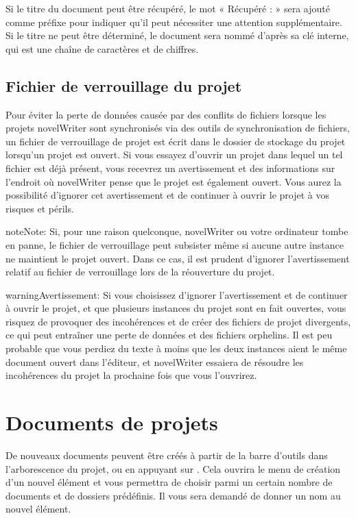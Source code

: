 \documentclass[a4paper,11pt,french]{sphinxmanual}
\begin{document}
\sphinxAtStartPar
Si le titre du document peut être récupéré, le mot « Récupéré : » sera ajouté comme préfixe pour indiquer qu’il peut nécessiter une attention supplémentaire. Si le titre ne peut être déterminé, le document sera nommé d’après sa clé interne, qui est une chaîne de caractères et de chiffres.


\subsection{Fichier de verrouillage du projet}
\label{\detokenize{project_overview:project-lockfile}}\label{\detokenize{project_overview:a-proj-roots-lock}}
\sphinxAtStartPar
Pour éviter la perte de données causée par des conflits de fichiers lorsque les projets novelWriter sont synchronisés via des outils de synchronisation de fichiers, un fichier de verrouillage de projet est écrit dans le dossier de stockage du projet lorsqu’un projet est ouvert. Si vous essayez d’ouvrir un projet dans lequel un tel fichier est déjà présent, vous recevrez un avertissement et des informations sur l’endroit où novelWriter pense que le projet est également ouvert. Vous aurez la possibilité d’ignorer cet avertissement et de continuer à ouvrir le projet à vos risques et périls.

\begin{sphinxadmonition}{note}{Note:}
\sphinxAtStartPar
Si, pour une raison quelconque, novelWriter ou votre ordinateur tombe en panne, le fichier de verrouillage peut subsister même si aucune autre instance ne maintient le projet ouvert. Dans ce cas, il est prudent d’ignorer l’avertissement relatif au fichier de verrouillage lors de la réouverture du projet.
\end{sphinxadmonition}

\begin{sphinxadmonition}{warning}{Avertissement:}
\sphinxAtStartPar
Si vous choisissez d’ignorer l’avertissement et de continuer à ouvrir le projet, et que plusieurs instances du projet sont en fait ouvertes, vous risquez de provoquer des incohérences et de créer des fichiers de projet divergents, ce qui peut entraîner une perte de données et des fichiers orphelins. Il est peu probable que vous perdiez du texte à moins que les deux instances aient le même document ouvert dans l’éditeur, et novelWriter essaiera de résoudre les incohérences du projet la prochaine fois que vous l’ouvrirez.
\end{sphinxadmonition}


\section{Documents de projets}
\label{\detokenize{project_overview:project-documents}}\label{\detokenize{project_overview:a-proj-files}}
\sphinxAtStartPar
De nouveaux documents peuvent être créés à partir de la barre d’outils dans l’arborescence du projet, ou en appuyant sur . Cela ouvrira le menu de création d’un nouvel élément et vous permettra de choisir parmi un certain nombre de documents et de dossiers prédéfinis. Il vous sera demandé de donner un nom au nouvel élément.
\end{document}
